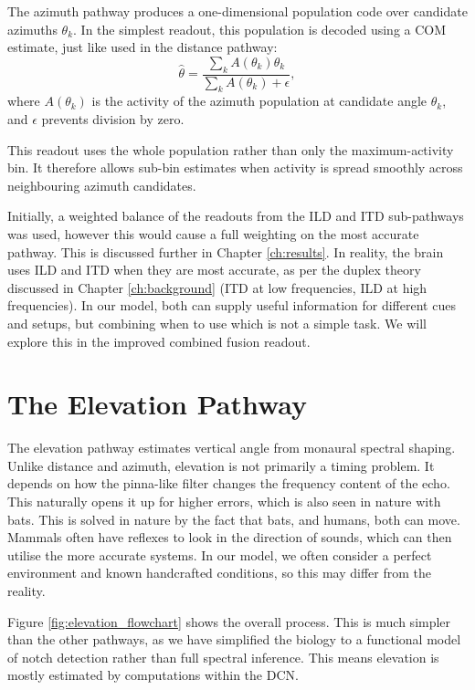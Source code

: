 The azimuth pathway produces a one-dimensional population code over candidate azimuths $\theta_k$. In the simplest readout, this population is decoded using a COM estimate, just like used in the distance pathway:
\begin{equation}
    \hat{\theta}
    =
    \frac{
        \sum_k A(\theta_k)\theta_k
    }{
        \sum_k A(\theta_k) + \epsilon
    },
\end{equation}
where $A(\theta_k)$ is the activity of the azimuth population at candidate angle $\theta_k$, and $\epsilon$ prevents division by zero.

This readout uses the whole population rather than only the maximum-activity bin. It therefore allows sub-bin estimates when activity is spread smoothly across neighbouring azimuth candidates. 

Initially, a weighted balance of the readouts from the ILD and ITD sub-pathways was used, however this would cause a full weighting on the most accurate pathway. This is discussed further in Chapter \ref{ch:results}. In reality, the brain uses ILD and ITD when they are most accurate, as per the duplex theory discussed in Chapter \ref{ch:background} (ITD at low frequencies, ILD at high frequencies). In our model, both can supply useful information for different cues and setups, but combining when to use which is not a simple task. We will explore this in the improved combined fusion readout.

\section{The Elevation Pathway}

The elevation pathway estimates vertical angle from monaural spectral shaping. Unlike distance and azimuth, elevation is not primarily a timing problem. It depends on how the pinna-like filter changes the frequency content of the echo. This naturally opens it up for higher errors, which is also seen in nature with bats. This is solved in nature by the fact that bats, and humans, both can move. Mammals often have reflexes to look in the direction of sounds, which can then utilise the more accurate systems. In our model, we often consider a perfect environment and known handcrafted conditions, so this may differ from the reality.

Figure \ref{fig:elevation_flowchart} shows the overall process. This is much simpler than the other pathways, as we have simplified the biology to a functional model of notch detection rather than full spectral inference. This means elevation is mostly estimated by computations within the DCN.

